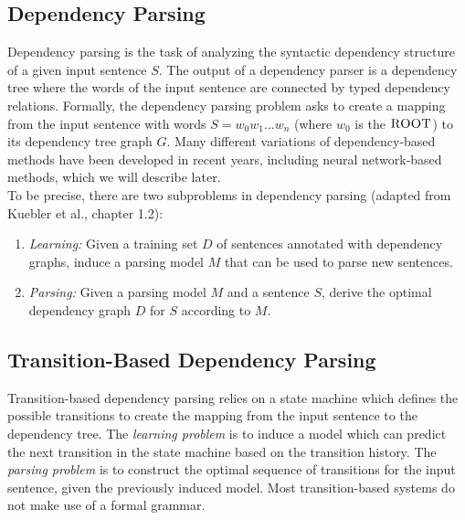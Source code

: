 \documentclass{tufte-handout}
\begin{document}
\subsection{Dependency Parsing}

Dependency parsing is the task of analyzing the syntactic dependency structure of a given input sentence $S$. The output of a dependency parser is a dependency tree where the words of the input sentence are connected by typed dependency relations. Formally, the dependency parsing problem asks to create a mapping from the input sentence with words $S=w_0w_1...w_n$ (where $w_0$ is the $\textsc{ROOT}$) to its dependency tree graph $G$. 
Many different variations of dependency-based methods have been developed in recent years, including neural network-based methods, which we will describe later.  \\
To be precise, there are two subproblems in dependency parsing (adapted from Kuebler et al., chapter 1.2): 
\begin{enumerate}
\item \textit{Learning:}
Given a training set $D$ of sentences annotated with dependency graphs, induce a parsing model $M$ that can be used to parse new sentences.
\item \textit{Parsing:}
Given a parsing model $M$ and a sentence $S$, derive the optimal dependency graph $D$ for $S$ according to $M$.
\end{enumerate}



\subsection{Transition-Based Dependency Parsing}
Transition-based dependency parsing relies on a state machine which defines the possible transitions to create the mapping from the input sentence to the dependency tree. 
The \textit{learning problem} is to induce a model which can predict the next transition in the state machine based on the transition history. The \textit{parsing problem} is to construct the optimal sequence of transitions for the input sentence, given the previously induced model.  
Most transition-based systems do not make use of a formal grammar.
\end{document}
